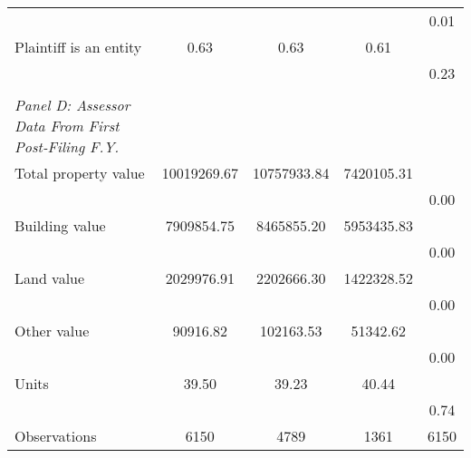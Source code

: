 {\begin{tabular}{l*{4}{c}}
                    &            &            &            &        0.01\\
\hspace{0.25cm}Plaintiff is an entity&        0.63&        0.63&        0.61&            \\
                    &            &            &            &        0.23\\
\vspace{0.1em} \\ \emph{Panel D: Assessor Data From First Post-Filing F.Y.}&            &            &            &            \\
\hspace{0.25cm}Total property value& 10019269.67& 10757933.84&  7420105.31&            \\
                    &            &            &            &        0.00\\
\hspace{0.25cm}Building value&  7909854.75&  8465855.20&  5953435.83&            \\
                    &            &            &            &        0.00\\
\hspace{0.25cm}Land value&  2029976.91&  2202666.30&  1422328.52&            \\
                    &            &            &            &        0.00\\
\hspace{0.25cm}Other value&    90916.82&   102163.53&    51342.62&            \\
                    &            &            &            &        0.00\\
\hspace{0.25cm}Units&       39.50&       39.23&       40.44&            \\
                    &            &            &            &        0.74\\
\midrule
Observations        &        6150&        4789&        1361&        6150\\
\bottomrule
\end{tabular}
}
